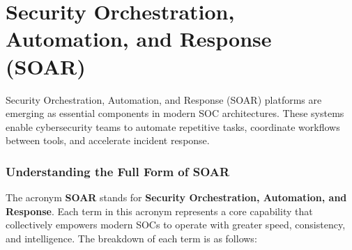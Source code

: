 \chapter{Security Orchestration, Automation, and Response (SOAR)}

Security Orchestration, Automation, and Response (SOAR) platforms are emerging as essential components in modern SOC architectures. These systems enable cybersecurity teams to automate repetitive tasks, coordinate workflows between tools, and accelerate incident response.

\subsection*{Understanding the Full Form of SOAR}

The acronym \textbf{SOAR} stands for \textbf{Security Orchestration, Automation, and Response}. Each term in this acronym represents a core capability that collectively empowers modern SOCs to operate with greater speed, consistency, and intelligence. The breakdown of each term is as follows:

